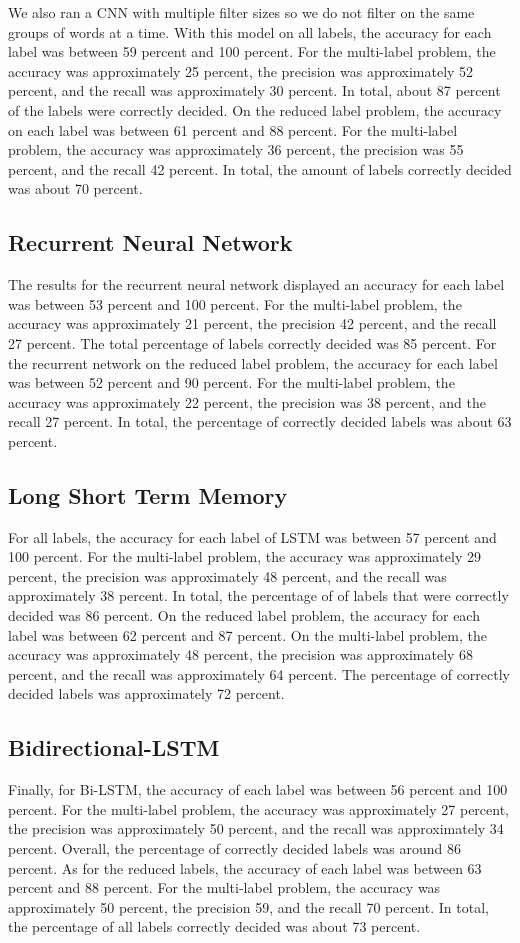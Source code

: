 \documentclass[sigconf]{acmart}
\begin{document}
We also ran a CNN with multiple filter sizes so we do not filter on the same groups of words at a time. With this model on all labels, the accuracy for each label was between 59 percent and 100 percent. For the multi-label problem, the accuracy was approximately 25 percent, the precision was approximately 52 percent, and the recall was approximately 30 percent. In total, about 87 percent of the labels were correctly decided. On the reduced label problem, the accuracy on each label was between 61 percent and 88 percent. For the multi-label problem, the accuracy was approximately 36 percent, the precision was 55 percent, and the recall 42 percent. In total, the amount of labels correctly decided was about 70 percent. 

\subsection{Recurrent Neural Network}
The results for the recurrent neural network displayed an accuracy for each label was between 53 percent and 100 percent. For the multi-label problem, the accuracy was approximately 21 percent, the precision 42 percent, and the recall 27 percent. The total percentage of labels correctly decided was 85 percent. For the recurrent network on the reduced label problem, the accuracy for each label was between 52 percent and 90 percent. For the multi-label problem, the accuracy was approximately 22 percent, the precision was 38 percent, and the recall 27 percent. In total, the percentage of correctly decided labels was about 63 percent.

\subsection{Long Short Term Memory}
For all labels, the accuracy for each label of LSTM was between 57 percent and 100 percent. For the multi-label problem, the accuracy was approximately 29 percent, the precision was approximately 48 percent, and the recall was approximately 38 percent. In total, the percentage of of labels that were correctly decided was 86 percent. On the reduced label problem, the accuracy for each label was between 62 percent and 87 percent. On the multi-label problem, the accuracy was approximately 48 percent, the precision was approximately 68 percent, and the recall was approximately 64 percent. The percentage of correctly decided labels was approximately 72 percent.

\subsection{Bidirectional-LSTM}
Finally, for Bi-LSTM, the accuracy of each label was between 56 percent and 100 percent. For the multi-label problem, the accuracy was approximately 27 percent, the precision was approximately 50 percent, and the recall was approximately 34 percent. Overall, the percentage of correctly decided labels was around 86 percent. As for the reduced labels, the accuracy of each label was between 63 percent and 88 percent. For the multi-label problem, the accuracy was approximately 50 percent, the precision 59, and the recall 70 percent. In total, the percentage of all labels correctly decided was about 73 percent.
\end{document}
